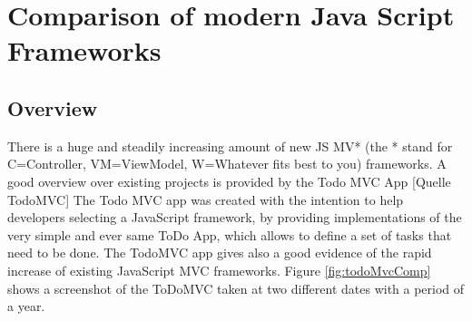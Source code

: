 \chapter{Comparison of modern Java Script Frameworks}


 
\section{Overview}

There is a huge and steadily increasing amount of new JS MV* (the * stand for C=Controller, VM=ViewModel, W=Whatever fits best to you) frameworks. 
A good overview over existing projects is provided by the Todo MVC App [Quelle TodoMVC]
The Todo MVC app was created with the intention to help developers selecting a JavaScript framework, by providing implementations of the very simple and ever same 
ToDo App, which allows to define a set of tasks that need to be done. 
The TodoMVC app gives also a good evidence of the rapid increase of existing JavaScript MVC frameworks. Figure \ref{fig:todoMvcComp} shows a screenshot of the ToDoMVC taken at two different dates with a period of a year.

